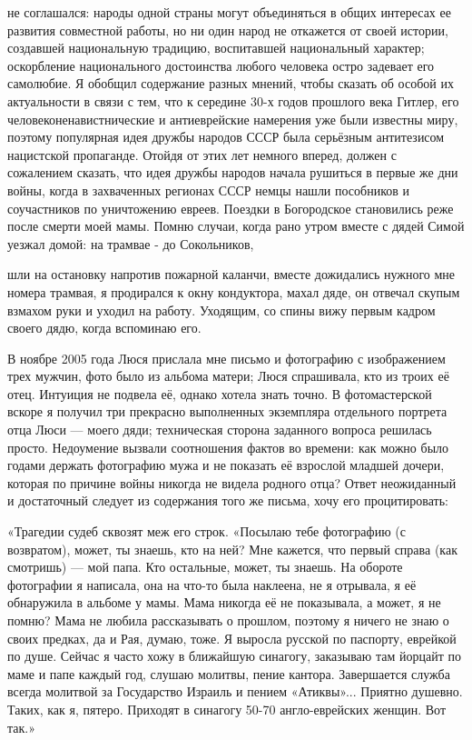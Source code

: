 не соглашался: народы одной страны могут объединяться в общих интересах ее развития совместной работы, но ни один народ не откажется от своей истории, создавшей национальную традицию, воспитавшей национальный характер; оскорбление национального достоинства любого человека остро задевает его самолюбие. Я обобщил содержание разных мнений, чтобы сказать об особой их актуальности в связи с тем, что к середине 30-х годов прошлого века Гитлер, его человеконенавистнические и антиеврейские намерения уже были известны миру, поэтому популярная идея дружбы народов СССР была серьёзным антитезисом нацистской пропаганде. Отойдя от этих лет немного вперед, должен с сожалением сказать, что идея дружбы народов начала рушиться в первые же дни войны, когда в захваченных регионах СССР немцы нашли пособников и соучастников по уничтожению евреев. Поездки в Богородское становились реже после смерти моей мамы. Помню случаи, когда рано утром вместе с дядей Симой уезжал домой: на трамвае - до Сокольников,

шли на остановку напротив пожарной каланчи, вместе дожидались нужного мне номера трамвая, я продирался к окну кондуктора, махал дяде, он отвечал скупым взмахом руки и уходил на работу. Уходящим, со спины вижу первым кадром своего дядю, когда вспоминаю его.

В ноябре 2005 года Люся прислала мне письмо и фотографию с изображением трех мужчин, фото было из альбома матери; Люся спрашивала, кто из троих её отец. Интуиция не подвела её, однако хотела знать точно. В фотомастерской вскоре я получил три прекрасно выполненных экземпляра отдельного портрета отца Люси — моего дяди; техническая сторона заданного вопроса решилась просто. Недоумение вызвали соотношения фактов во времени: как можно было годами держать фотографию мужа и не показать её взрослой младшей дочери, которая по причине войны никогда не видела родного отца? Ответ неожиданный и достаточный следует из содержания того же письма, хочу его процитировать:

«Трагедии судеб сквозят меж его строк. «Посылаю тебе фотографию (с возвратом), может, ты знаешь, кто на ней? Мне кажется, что первый справа (как смотришь) — мой папа. Кто остальные, может, ты знаешь. На обороте фотографии я написала, она на что-то была наклеена, не я отрывала, я её обнаружила в альбоме у мамы. Мама никогда её не показывала, а может, я не помню? Мама не любила рассказывать о прошлом, поэтому я ничего не знаю о своих предках, да и Рая, думаю, тоже. Я выросла русской по паспорту, еврейкой по душе. Сейчас я часто хожу в ближайшую синагогу, заказываю там йорцайт по маме и папе каждый год, слушаю молитвы, пение кантора. Завершается служба всегда молитвой за Государство Израиль и пением «Атиквы»... Приятно душевно. Таких, как я, пятеро. Приходят в синагогу 50-70 англо-еврейских женщин. Вот так.»

